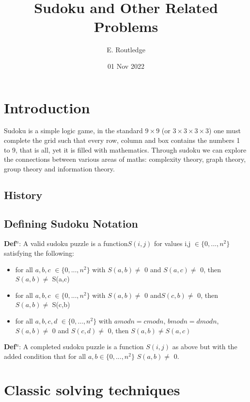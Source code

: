 \documentclass[a4paper,12pt]{article}
\author{E. Routledge}
\date{01 Nov 2022}
\title{Sudoku and Other Related Problems}
\begin{document}
\lstset{language=Python}
\maketitle

\section{Introduction}
		Sudoku is a simple logic game, in the standard $9 \times 9$ (or $3 \times 3 \times 3 \times 3$) 
		one must complete the grid such that every row, column and box contains the numbers 1 to 9, that is all,
		yet it is filled with mathematics. Through sudoku we can explore the connections between various areas of maths: complexity theory, graph theory, group theory and information theory.
	\subsection{History}
	
	\subsection{Defining Sudoku Notation}
	
	\textbf{Def$^n$}: A valid sudoku puzzle is a function$ S(i,j)$ for values i,j $\in \{0,...,n^2\}$ satisfying the following:
\begin{itemize}
	\item{for all $a,b,c$  $\in \{0,...,n^2\}$ with $S(a,b)\neq$ 0 and $S(a,c)\neq$ 0, then $ S(a,b)\neq$ S(a,c) }
	\item{for all $a,b,c$  $\in \{0,...,n^2\}$ with $S(a,b)\neq$ 0 and$ S(c,b)\neq$ 0, then $S(a,b)\neq$ S(c,b) }
	\item{for all $ a,b,c,d $ $\in \{0,...,n^2\}$ with $a mod n = c mod n$, $b mod n  =  d mod n$, $S(a,b)\neq$ 0 and $S(c,d) \neq$ 0, then $S(a,b)\neq S(a,c)$ }
\end{itemize}
\textbf{Def$^n$}: A completed sudoku puzzle is a function $S(i,j)$ as above but with the added condition that for all $a,b \in \{0,...,n^2\}$ $S(a,b) \neq$ 0.

\section{Classic solving techniques}
\end{document}
